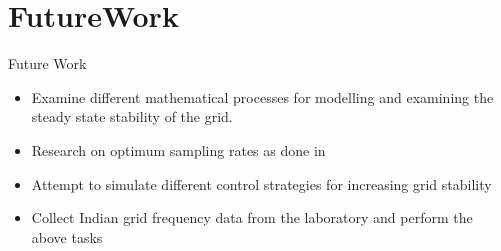 \section[Future Work]{FutureWork}
\label{sec:future_work}

\begin{frame}{Future Work}
	\begin{itemize}[<alert@+>]
		\item Examine different mathematical processes for modelling and examining the steady state stability of the grid.
		\item Research on optimum sampling rates as done in \cite{lrydin01}
		\item Attempt to simulate different control strategies for increasing grid stability 
		\item Collect Indian grid frequency data from the laboratory and perform the above tasks
	\end{itemize}
\end{frame}